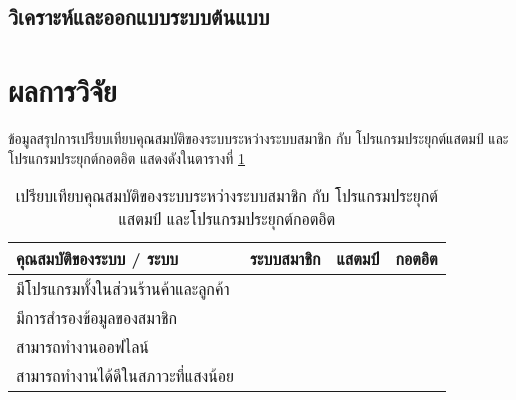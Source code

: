 \documentclass[12pt,a4paper,twocolumn]{article}
\newcommand{\cmark}{\ding{51}}
\newcommand{\xmark}{\ding{55}}
\begin{document}
\subsection{วิเคราะห์และออกแบบระบบต้นแบบ}




\section{ผลการวิจัย}

ข้อมูลสรุปการเปรียบเทียบคุณสมบัติของระบบระหว่างระบบสมาชิก กับ โปรแกรมประยุกต์แสตมป์ และโปรแกรมประยุกต์กอตอิต แสดงดังในตารางที่ \ref{tab:compare_feature}

\begin{table}[ht!]
\centering
\resizebox{81mm}{!} {
\begin{tabular}{ | l | c | c | c |}
	\hline                        
  	คุณสมบัติของระบบ / ระบบ            	& ระบบสมาชิก & แสตมป์ & กอตอิต \\
  	\hline 
  	มีโปรแกรมทั้งในส่วนร้านค้าและลูกค้า 		& \cmark & \xmark & \xmark \\
  	\hline
  	มีการสำรองข้อมูลของสมาชิก				& \cmark & \cmark & \cmark \\
  	\hline
  	สามารถทำงานออฟไลน์                 	& \cmark & \cmark & \cmark \\
  	\hline
  	สามารถทำงานได้ดีในสภาวะที่แสงน้อย    	& \cmark & \cmark & \xmark \\
  	\hline
\end{tabular}
}
\caption{เปรียบเทียบคุณสมบัติของระบบระหว่างระบบสมาชิก กับ โปรแกรมประยุกต์แสตมป์ และโปรแกรมประยุกต์กอตอิต}
\label{tab:compare_feature}
\end{table}
\end{document}
